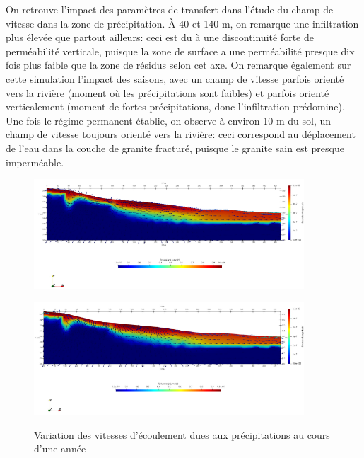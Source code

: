 \documentclass{article}
\begin{document}
On retrouve l'impact des paramètres de transfert dans l'étude du champ de vitesse dans la zone de précipitation. À 40 et 140 m, on remarque une infiltration plus élevée que partout ailleurs: ceci est du à une discontinuité forte de perméabilité verticale, puisque la zone de surface a une perméabilité presque dix fois plus faible que la zone de résidus selon cet axe. On remarque également sur cette simulation l'impact des saisons, avec un champ de vitesse parfois orienté vers la rivière (moment où les précipitations sont faibles) et parfois orienté verticalement (moment de fortes précipitations, donc l'infiltration prédomine). Une fois le régime permanent établie, on observe à environ 10 m du sol, un champ de vitesse toujours orienté vers la rivière: ceci correspond au déplacement de l'eau dans la couche de granite fracturé, puisque le granite sain est presque imperméable.

\begin{figure}[H]
    \centering
    \begin{minipage}{0.5\textwidth}
        \centering
        \includegraphics[width=0.9\textwidth]{III_B_3_6.png} 
        \label{fig:v_précipitations_ribiere_1}
    \end{minipage}\hfill
    \begin{minipage}{0.5\textwidth}
        \centering
        \includegraphics[width=0.9\textwidth]{III_B_3_7.png} 
        \label{fig:v_précipitations_ribiere_2}
    \end{minipage}
    \caption{Variation des vitesses d'écoulement dues aux précipitations au cours d'une année}
\end{figure}
\end{document}
